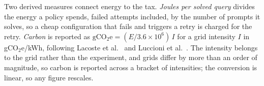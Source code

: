 Two derived measures connect energy to the tax. \emph{Joules per solved
query} divides the energy a policy spends, failed attempts included, by the
number of prompts it solves, so a cheap configuration that fails and triggers
a retry is charged for the retry. \emph{Carbon} is reported as
$\mathrm{gCO_2e} = (E/3.6 \times 10^{6})\,I$ for a grid intensity $I$ in
gCO$_2$e/kWh, following Lacoste et al.\ \cite{lacoste2019quantifying} and
Luccioni et al.\ \cite{luccioni2024powerhungry}. The intensity belongs to the
grid rather than the experiment, and grids differ by more than an order of
magnitude, so carbon is reported across a bracket of intensities; the
conversion is linear, so any figure rescales.
